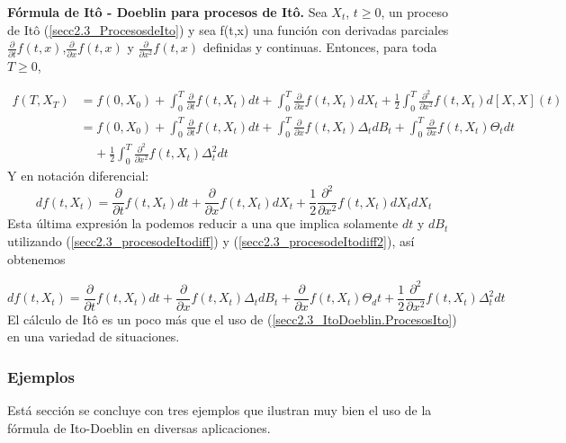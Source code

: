 \documentclass[11pt,notitlepage]{article}
\begin{document}
\begin{teor}
\textbf{\label{secc2.3_teo2} Fórmula de Itô - Doeblin para procesos de Itô.} Sea $X_{t}$, $t\geq0$, un proceso de Itô (\ref{secc2.3_ProcesosdeIto}) y sea f(t,x) una función con derivadas parciales $\frac{\partial}{\partial t}f(t,x)$,$\frac{\partial}{\partial x}f(t,x)$ y $\frac{\partial}{\partial x^2}f(t,x)$ definidas y continuas. Entonces, para toda $T\geq0$,
\end{teor}

\begin{align*}
    f(T,X_{T})&=f(0,X_{0})+\int_{0}^{T}\frac{\partial}{\partial t}f(t,X_{t})dt+ \int_{0}^{T}\frac{\partial}{\partial x}f(t,X_{t})dX_{t}+\frac{1}{2} \int_{0}^{T}\frac{\partial^2}{\partial x^2}f(t,X_{t})d[X,X](t)\\
    &=f(0,X_{0})+\int_{0}^{T}\frac{\partial}{\partial t}f(t,X_{t})dt+\int_{0}^{T}\frac{\partial}{\partial x}f(t,X_{t})\Delta_{t}dB_{t}+\int_{0}^{T}\frac{\partial}{\partial x}f(t,X_{t})\Theta_{t}dt\\
    &\ \ \ \ \ +\frac{1}{2} \int_{0}^{T}\frac{\partial^2}{\partial x^2}f(t,X_{t})\Delta_{t}^{2}dt
\end{align*}
 Y en notación diferencial:
\begin{equation*}
    df(t,X_{t})=\frac{\partial}{\partial t}f(t,X_{t})dt+\frac{\partial}{\partial x}f(t,X_{t})dX_{t}+\frac{1}{2}\frac{\partial^2}{\partial x^2}f(t,X_{t})dX_{t}dX_{t}
\end{equation*}
Esta última expresión la podemos reducir a una que implica solamente $dt$ y $dB_{t}$ utilizando (\ref{secc2.3_procesodeItodiff}) y (\ref{secc2.3_procesodeItodiff2}), así obtenemos

\begin{equation}\label{secc2.3_ItoDoeblin.ProcesosIto}
      df(t,X_{t})=\frac{\partial}{\partial t}f(t,X_{t})dt+\frac{\partial}{\partial x}f(t,X_{t})\Delta_{t}dB_{t}+\frac{\partial}{\partial x}f(t,X_{t})\Theta_dt+\frac{1}{2}\frac{\partial^2}{\partial x^2}f(t,X_{t})\Delta_{t}^{2}dt
\end{equation}
El cálculo de Itô es un poco más que el uso de (\ref{secc2.3_ItoDoeblin.ProcesosIto}) en una variedad de situaciones.


\subsubsection{Ejemplos}
Está sección se concluye con tres ejemplos que ilustran muy bien el uso de la fórmula de Ito-Doeblin en diversas aplicaciones.\\
\end{document}
